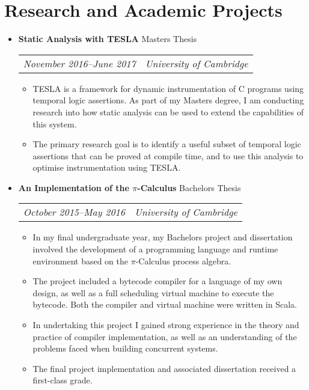 \documentclass[letterpaper]{article}
\begin{document}
\section*{Research and Academic Projects}
  \begin{itemize}
    \item \textbf{Static Analysis with TESLA} Masters Thesis \\
      \begin{tabular}{c|c}
        \emph{November 2016--June 2017} & \emph{University of Cambridge}
      \end{tabular}
      \begin{itemize}
        \item TESLA is a framework for dynamic instrumentation of C programs
          using temporal logic assertions. As part of my Masters degree, I am
          conducting research into how static analysis can be used to extend the
          capabilities of this system.

        \item The primary research goal is to identify a useful subset of
          temporal logic assertions that can be proved at compile time, and to
          use this analysis to optimise instrumentation using TESLA.
      \end{itemize}

    \item \textbf{An Implementation of the $\pi$-Calculus} Bachelors Thesis \\
        \begin{tabular}{c|c}
            \emph{October 2015--May 2016} & \emph{University of Cambridge}
        \end{tabular}
        \begin{itemize}
            \item In my final undergraduate year, my Bachelors project and
              dissertation involved the development of a programming language
              and runtime environment based on the $\pi$-Calculus process
              algebra.

            \item The project included a bytecode compiler for a language of my
              own design, as well as a full scheduling virtual machine to
              execute the bytecode. Both the compiler and virtual machine were
              written in Scala.

            \item In undertaking this project I gained strong experience in the
              theory and practice of compiler implementation, as well as an
              understanding of the problems faced when building concurrent
              systems.

            \item The final project implementation and associated dissertation
              received a first-class grade.
        \end{itemize}
  \end{itemize}
\end{document}
